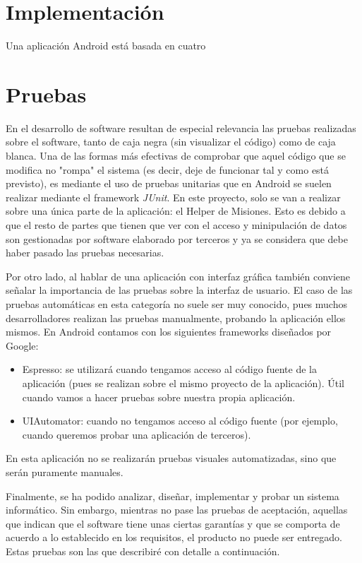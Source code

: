 \documentclass[twoside]{report}
\begin{document}
\section{Implementación}

Una aplicación Android está basada en cuatro

\section{Pruebas}

En el desarrollo de software resultan de especial relevancia las pruebas realizadas sobre el software, tanto de caja negra (sin visualizar el código) como de caja blanca. Una de las formas más efectivas de comprobar que aquel código que se modifica no "rompa" el sistema (es decir, deje de funcionar tal y como está previsto), es mediante el uso de pruebas unitarias que en Android se suelen realizar mediante el framework \textit{JUnit}. En este proyecto, solo se van a realizar sobre una única parte de la aplicación: el Helper de Misiones. Esto es debido a que el resto de partes que tienen que ver con el acceso y minipulación de datos son gestionadas por software elaborado por terceros y ya se considera que debe haber pasado las pruebas necesarias.

Por otro lado, al hablar de una aplicación con interfaz gráfica también conviene señalar la importancia de las pruebas sobre la interfaz de usuario. El caso de las pruebas automáticas en esta categoría no suele ser muy conocido, pues muchos desarrolladores realizan las pruebas manualmente, probando la aplicación ellos mismos. En Android contamos con los siguientes frameworks diseñados por Google:
\begin{itemize}
\item Espresso: se utilizará cuando tengamos acceso al código fuente de la aplicación (pues se realizan sobre el mismo proyecto de la aplicación). Útil cuando vamos a hacer pruebas sobre nuestra propia aplicación.
\item UIAutomator: cuando no tengamos acceso al código fuente (por ejemplo, cuando queremos probar una aplicación de terceros).
\end{itemize}
En esta aplicación no se realizarán pruebas visuales automatizadas, sino que serán puramente manuales.

Finalmente, se ha podido analizar, diseñar, implementar y probar un sistema informático. Sin embargo, mientras no pase las pruebas de aceptación, aquellas que indican que el software tiene unas ciertas garantías y que se comporta de acuerdo a lo establecido en los requisitos, el producto no puede ser entregado. Estas pruebas son las que describiré con detalle a continuación.
\end{document}

